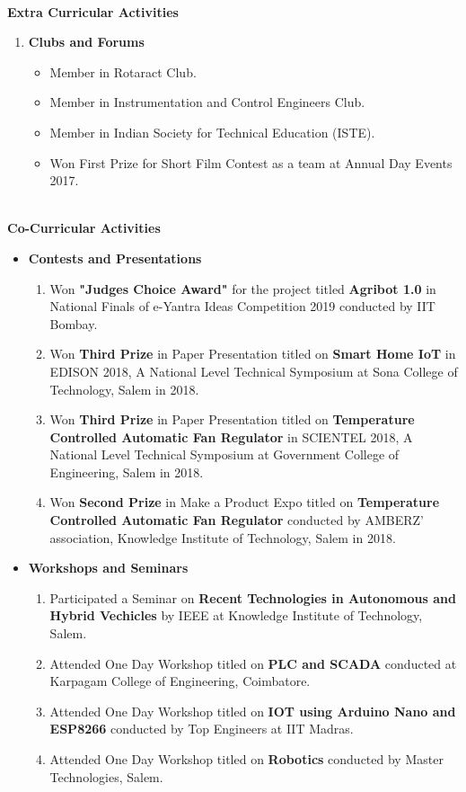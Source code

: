 \documentclass{article}
\begin{document}
\begin{flushleft}
		\Large \textbf{\\Extra Curricular Activities}\
		\begin{enumerate}	\item \textbf{Clubs and Forums}
			\begin{itemize}
				\item Member in Rotaract Club.
				\item Member in Instrumentation and Control Engineers Club.
				\item Member in Indian Society for Technical Education (ISTE).
				\item Won First Prize for Short Film Contest as a team at Annual Day Events 2017.
			\end{itemize}
		\end{enumerate}
		
		\Large \textbf{\\Co-Curricular Activities}\
		\begin{itemize}
			\item \textbf{Contests and Presentations}
			\begin{enumerate}
				\item Won \textbf{"Judges Choice Award"} for the project titled \textbf{Agribot 1.0} in National Finals of e-Yantra Ideas Competition 2019 conducted by IIT Bombay.  
				\item Won \textbf{Third Prize} in Paper Presentation titled on \textbf{Smart Home IoT} in EDISON 2018, A National Level Technical Symposium at Sona College of Technology, Salem in 2018.
				\item Won \textbf{Third Prize} in Paper Presentation titled on \textbf{Temperature Controlled Automatic Fan Regulator} in SCIENTEL 2018, A National Level Technical Symposium at Government College of Engineering, Salem in 2018.
				\item Won \textbf{Second Prize} in Make a Product Expo titled on \textbf{Temperature Controlled Automatic Fan Regulator} conducted by AMBERZ’ association, Knowledge Institute of Technology, Salem in 2018.
				
			\end{enumerate}
			\item \textbf{Workshops and Seminars}
			\begin{enumerate}
				\item Participated a Seminar on \textbf{Recent Technologies in Autonomous and Hybrid Vechicles} by IEEE at Knowledge Institute of Technology, Salem.
				\item Attended One Day Workshop titled on \textbf{PLC and SCADA} conducted at Karpagam College of Engineering, Coimbatore.
				\item Attended One Day Workshop titled on \textbf{IOT using Arduino Nano and ESP8266} conducted by Top Engineers at IIT Madras.
				\item Attended One Day Workshop titled on \textbf{Robotics} conducted by Master Technologies, Salem.
			\end{enumerate}
		\end{itemize}	
		

\end{flushleft}
\end{document}
